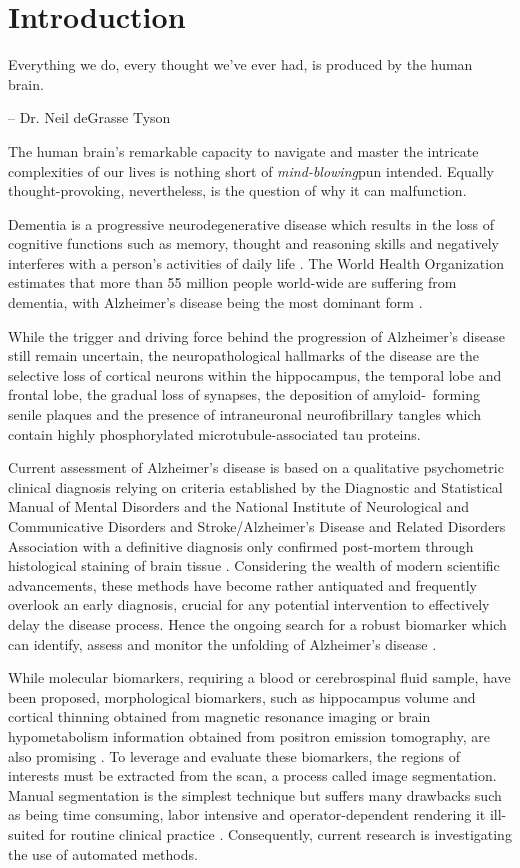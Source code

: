 \section{Introduction}

\epigraph{Everything we do, every thought we've ever had, is produced by the human brain.}{-- Dr. Neil deGrasse Tyson}

The human brain's remarkable capacity to navigate and master the intricate complexities of our lives is nothing short of \emph{mind-blowing}\textemdash{}pun intended. Equally thought-provoking, nevertheless, is the question of why it can malfunction.

Dementia is a progressive neurodegenerative disease which results in the loss of cognitive functions such as memory, thought and reasoning skills and negatively interferes with a person's activities of daily life \cite{b1}. The World Health Organization estimates that more than 55 million people world-wide are suffering from dementia, with Alzheimer's disease being the most dominant form \cite{b2}. 

While the trigger and driving force behind the progression of Alzheimer's disease still remain uncertain, the neuropathological hallmarks of the disease are the selective loss of cortical neurons within the hippocampus, the temporal lobe and frontal lobe, the gradual loss of synapses, the deposition of amyloid-\textbeta\ forming senile plaques and the presence of intraneuronal neurofibrillary tangles which contain highly phosphorylated microtubule-associated tau proteins. \cite{b3,b4} 

Current assessment of Alzheimer's disease is based on a qualitative psychometric clinical diagnosis relying on criteria established by the Diagnostic and Statistical Manual of Mental Disorders and the National Institute of Neurological and Communicative Disorders and Stroke/Alzheimer's Disease and Related Disorders Association with a definitive diagnosis only confirmed post-mortem through histological staining of brain tissue \cite{b4,b5}. Considering the wealth of modern scientific advancements, these methods have become rather antiquated and frequently overlook an early diagnosis, crucial for any potential intervention to effectively delay the disease process. Hence the ongoing search for a robust biomarker which can identify, assess and monitor the unfolding of Alzheimer's disease \cite{b4}.

While molecular biomarkers, requiring a blood or cerebrospinal fluid sample, have been proposed, morphological biomarkers, such as hippocampus volume and cortical thinning obtained from magnetic resonance imaging or brain hypometabolism information obtained from positron emission tomography, are also promising \cite{b4,b5}. To leverage and evaluate these biomarkers, the regions of interests must be extracted from the scan, a process called image segmentation. Manual segmentation is the simplest technique but suffers many drawbacks such as being time consuming, labor intensive and operator-dependent rendering it ill-suited for routine clinical practice \cite{b6}. Consequently, current research is investigating the use of automated methods.

